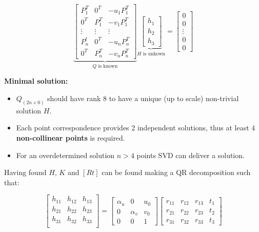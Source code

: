\documentclass[10pt,a4paper]{scrartcl}
\begin{document}
\begin{multicols*}{2}
\begin{enumerate}
\begin{equation*}
\underbrace{\begin{bmatrix}
P_1^T&0^T&-u_1 P_1^T\\
0^T&P_1^T&-v_1P_1^T\\
\vdots&\vdots&\vdots\\
P_n^t&0^T&-u_nP_n^T\\
0^T&P_n^T&-v_nP_n^T
\end{bmatrix}}_{Q \text{ is known}}\underbrace{\begin{bmatrix}
h_1\\h_2\\h_3
\end{bmatrix}}_{H \text{ is unkown}}=\begin{bmatrix}
0\\0\\\vdots\\0\\0
\end{bmatrix}
\end{equation*}

\end{enumerate}

\textbf{Minimal solution:}

\begin{itemize}
\item $Q_{(2n\times 0)}$ should have rank $8$ to have a unique (up to scale) non-trivial solution $H$.
\item Each point correspondence provides 2 independent solutions, thus at least $4$ \textbf{non-collinear points} is required.
\item For an overdetermined solution $n>4$ points SVD can deliver a solution.
\end{itemize}

Having found $H$, $K$ and $[R t]$ can be found making a QR decomposition such that:

\begin{equation*}
\begin{bmatrix}
h_{11}&h_{12}&h_{13}\\
h_{21}&h_{22}&h_{23}\\
h_{31}&h_{32}&h_{33}\\
\end{bmatrix}=\begin{bmatrix}\alpha_u&0&u_0\\0&\alpha_v&v_0\\0&0&1\end{bmatrix}\begin{bmatrix}
r_{11}&r_{12}&r_{13}&t_1\\r_{21}&r_{22}&r_{23}&t_2\\r_{31}&r_{32}&r_{33}&t_3
\end{bmatrix}
\end{equation*}


\end{multicols*}
\end{document}
